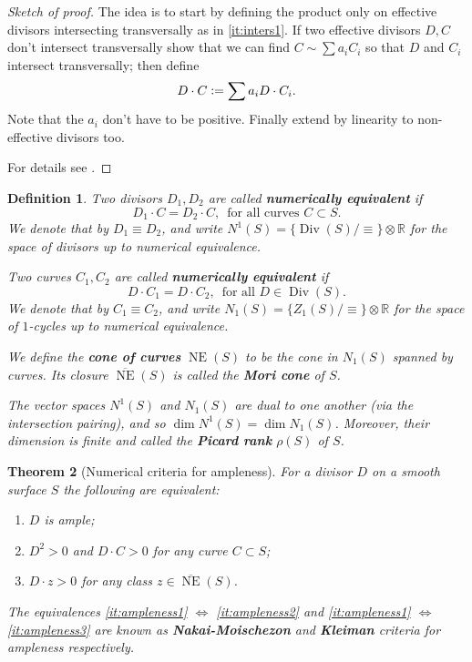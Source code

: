 \documentclass[a4paper,11pt]{amsart}
\newtheorem{theorem}{Theorem}[section]
\newtheorem{definition}[theorem]{Definition}
\def\dim{\operatorname{dim}}
\def\Div{\operatorname{Div}}
\def\NE{\operatorname{NE}}
\def\NEb{\overline{\operatorname{NE}}}
\newcommand{\RR}{\mathbb{R}}
\newcommand{\defeq}{\vcentcolon=}
\begin{document}
\begin{proof}[Sketch of proof]
	The idea is to start by defining the product only on effective divisors intersecting transversally as in \eqref{it:inters1}.
	If two effective divisors $D, C$ don't intersect transversally show that we can find $C\sim \sum a_i C_i$ so that $D$ and $C_i$ intersect transversally;
	then define 
	\[
	D \cdot C \defeq \sum a_i D\cdot C_i.
	\]
	Note that the $a_i$ don't have to be positive.
	Finally extend by linearity to non-effective divisors too.
	
	For details see \cite[Chapter V, Theorem 1.1]{Hartshorne}.
\end{proof}


\begin{definition}
	Two divisors $D_1, D_2$ are called \textbf{numerically equivalent} if
	\[
	D_1 \cdot C = D_2 \cdot C, \, \text{ for all curves $C \subset S$}.
	\]
	We denote that by $D_1 \equiv D_2$, and write $N^1(S) = \{\Div(S)/\equiv\}\otimes \RR$ for the space of divisors up to numerical equivalence.
	
	Two curves $C_1, C_2$ are called \textbf{numerically equivalent} if
	\[
	D \cdot C_1 = D \cdot C_2, \, \text{ for all $D \in \Div(S)$}.
	\]
	We denote that by $C_1 \equiv C_2$, and write $N_1(S) = \{Z_1(S)/\equiv\}\otimes \RR$ for the space of $1$-cycles up to numerical equivalence.
	
	We define the \textbf{cone of curves} $\NE(S)$ to be the cone in $N_1(S)$ spanned by curves. 
	Its closure $\NEb(S)$ is called the \textbf{Mori cone} of $S$.
	
	The vector spaces $N^1(S)$ and $N_1(S)$ are dual to one another (via the intersection pairing), and so $\dim N^1(S) = \dim N_1(S)$.
	Moreover, their dimension is finite and called the \textbf{Picard rank} $\rho(S)$ of $S$.
\end{definition}



\begin{theorem}[{Numerical criteria for ampleness}]\label{thm:NM}
	For a divisor $D$ on a smooth surface $S$ the following are equivalent:
	\begin{enumerate}
		\item\label{it:ampleness1} $D$ is ample;
		\item\label{it:ampleness2} $D^2 > 0$ and $D\cdot C > 0$ for any curve $C \subset S$;
		\item\label{it:ampleness3} $D\cdot z >0$ for any class $z \in \NEb(S)$.
	\end{enumerate}
	
	The equivalences \eqref{it:ampleness1} $\Leftrightarrow$ \eqref{it:ampleness2} and \eqref{it:ampleness1} $\Leftrightarrow$ \eqref{it:ampleness3} are known as \textbf{Nakai-Moischezon} and \textbf{Kleiman} criteria for ampleness respectively.
\end{theorem}
\end{document}
